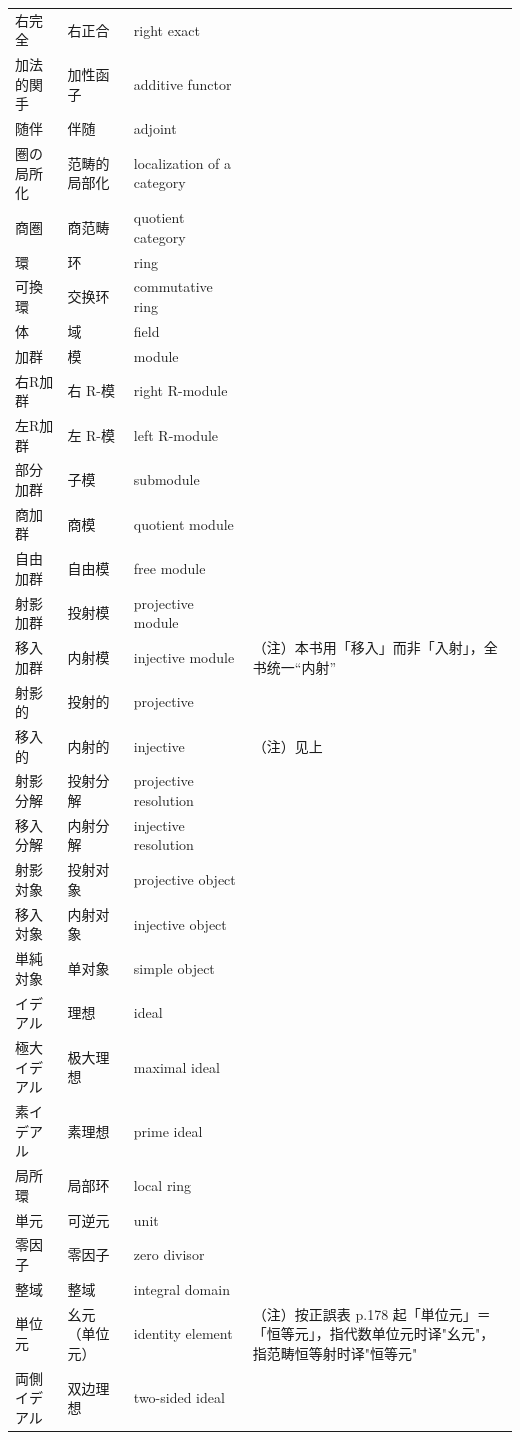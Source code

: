 \begin{longtable}{p{}p{}p{}p{}}
右完全 & 右正合 & right exact &  \\
加法的関手 & 加性函子 & additive functor &  \\
随伴 & 伴随 & adjoint &  \\
圏の局所化 & 范畴的局部化 & localization of a category &  \\
商圏 & 商范畴 & quotient category &  \\
環 & 环 & ring &  \\
可換環 & 交换环 & commutative ring &  \\
体 & 域 & field &  \\
加群 & 模 & module &  \\
右R加群 & 右 R-模 & right R-module &  \\
左R加群 & 左 R-模 & left R-module &  \\
部分加群 & 子模 & submodule &  \\
商加群 & 商模 & quotient module &  \\
自由加群 & 自由模 & free module &  \\
射影加群 & 投射模 & projective module &  \\
移入加群 & 内射模 & injective module & （注）本书用「移入」而非「入射」，全书统一“内射” \\
射影的 & 投射的 & projective &  \\
移入的 & 内射的 & injective & （注）见上 \\
射影分解 & 投射分解 & projective resolution &  \\
移入分解 & 内射分解 & injective resolution &  \\
射影対象 & 投射对象 & projective object &  \\
移入対象 & 内射对象 & injective object &  \\
単純対象 & 单对象 & simple object &  \\
イデアル & 理想 & ideal &  \\
極大イデアル & 极大理想 & maximal ideal &  \\
素イデアル & 素理想 & prime ideal &  \\
局所環 & 局部环 & local ring &  \\
単元 & 可逆元 & unit &  \\
零因子 & 零因子 & zero divisor &  \\
整域 & 整域 & integral domain &  \\
単位元 & 幺元（单位元） & identity element & （注）按正誤表 p.178 起「単位元」＝「恒等元」，指代数单位元时译"幺元"，指范畴恒等射时译"恒等元" \\
両側イデアル & 双边理想 & two-sided ideal &  \\

\end{longtable}

